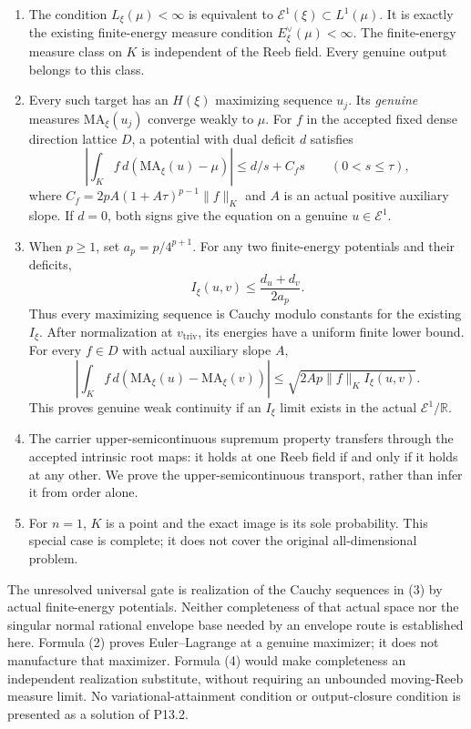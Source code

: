 \documentclass[
  10pt,
]{article}
\providecommand{\tightlist}{%
  \setlength{\itemsep}{0pt}\setlength{\parskip}{0pt}}
\begin{document}
\begin{enumerate}
\def\labelenumi{\arabic{enumi}.}
\tightlist
\item
  The condition \(L_\xi(\mu)<\infty\) is equivalent to
  \(\mathcal E^1(\xi)\subset L^1(\mu)\). It is exactly the existing
  finite-energy measure condition \(E_\xi^\vee(\mu)<\infty\). The
  finite-energy measure class on \(K\) is independent of the Reeb field.
  Every genuine output belongs to this class.
\item
  Every such target has an \(H(\xi)\) maximizing sequence \(u_j\). Its
  \emph{genuine} measures \(\mathrm{MA}_\xi(u_j)\) converge weakly to
  \(\mu\). For \(f\) in the accepted fixed dense direction lattice
  \(D\), a potential with dual deficit \(d\) satisfies \[
   \left|\int_K f\,d(\mathrm{MA}_\xi(u)-\mu)\right|
   \leq d/s+C_f s\qquad(0<s\leq\tau),                                  \tag{2}
  \] where \(C_f=2pA(1+A\tau)^{p-1}\|f\|_K\) and \(A\) is an actual
  positive auxiliary slope. If \(d=0\), both signs give the equation on
  a genuine \(u\in\mathcal E^1\).
\item
  When \(p\geq1\), set \(a_p=p/4^{p+1}\). For any two finite-energy
  potentials and their deficits, \[
   I_\xi(u,v)\leq\frac{d_u+d_v}{2a_p}.                                  \tag{3}
  \] Thus every maximizing sequence is Cauchy modulo constants for the
  existing \(I_\xi\). After normalization at \(v_{\mathrm{triv}}\), its
  energies have a uniform finite lower bound. For every \(f\in D\) with
  actual auxiliary slope \(A\), \[
   \left|\int_Kf\,d(\mathrm{MA}_\xi(u)-\mathrm{MA}_\xi(v))\right|
   \leq\sqrt{2Ap\|f\|_K I_\xi(u,v)}.                                   \tag{4}
  \] This proves genuine weak continuity if an \(I_\xi\) limit exists in
  the actual \(\mathcal E^1/\mathbb R\).
\item
  The carrier upper-semicontinuous supremum property transfers through
  the accepted intrinsic root maps: it holds at one Reeb field if and
  only if it holds at any other. We prove the upper-semicontinuous
  transport, rather than infer it from order alone.
\item
  For \(n=1\), \(K\) is a point and the exact image is its sole
  probability. This special case is complete; it does not cover the
  original all-dimensional problem.
\end{enumerate}

The unresolved universal gate is realization of the Cauchy sequences in
(3) by actual finite-energy potentials. Neither completeness of that
actual space nor the singular normal rational envelope base needed by an
envelope route is established here. Formula (2) proves Euler--Lagrange
at a genuine maximizer; it does not manufacture that maximizer. Formula
(4) would make completeness an independent realization substitute,
without requiring an unbounded moving-Reeb measure limit. No
variational-attainment condition or output-closure condition is
presented as a solution of P13.2.
\end{document}
